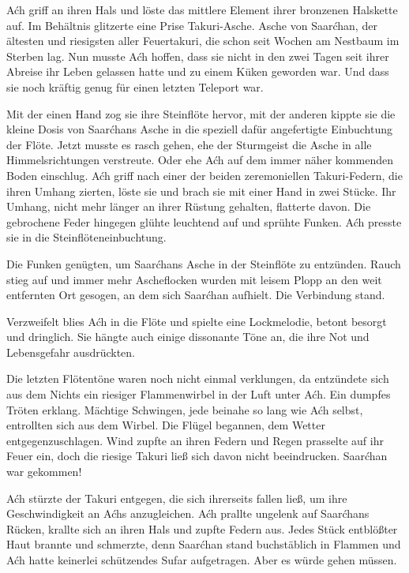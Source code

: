 Aćh griff an ihren Hals und löste das mittlere Element ihrer bronzenen Halskette auf. Im Behältnis glitzerte eine Prise Takuri-Asche. Asche von Saarćhan, der ältesten und riesigsten aller Feuertakuri, die schon seit Wochen am Nestbaum im Sterben lag. Nun musste Aćh hoffen, dass sie nicht in den zwei Tagen seit ihrer Abreise ihr Leben gelassen hatte und zu einem Küken geworden war. Und dass sie noch kräftig genug für einen letzten Teleport war.

Mit der einen Hand zog sie ihre Steinflöte hervor, mit der anderen kippte sie die kleine Dosis von Saarćhans Asche in die speziell dafür angefertigte Einbuchtung der Flöte. Jetzt musste es rasch gehen, ehe der Sturmgeist die Asche in alle Himmelsrichtungen verstreute. Oder ehe Aćh auf dem immer näher kommenden Boden einschlug. Aćh griff nach einer der beiden zeremoniellen Takuri-Federn, die ihren Umhang zierten, löste sie und brach sie mit einer Hand in zwei Stücke. Ihr Umhang, nicht mehr länger an ihrer Rüstung gehalten, flatterte davon. Die gebrochene Feder hingegen glühte leuchtend auf und sprühte Funken. Aćh presste sie in die Steinflöteneinbuchtung.

Die Funken genügten, um Saarćhans Asche in der Steinflöte zu entzünden. Rauch stieg auf und immer mehr Ascheflocken wurden mit leisem Plopp an den weit entfernten Ort gesogen, an dem sich Saarćhan aufhielt. Die Verbindung stand.

Verzweifelt blies Aćh in die Flöte und spielte eine Lockmelodie, betont besorgt und dringlich. Sie hängte auch einige dissonante Töne an, die ihre Not und Lebensgefahr ausdrückten.

Die letzten Flötentöne waren noch nicht einmal verklungen, da entzündete sich aus dem Nichts ein riesiger Flammenwirbel in der Luft unter Aćh. Ein dumpfes Tröten erklang. Mächtige Schwingen, jede beinahe so lang wie Aćh selbst, entrollten sich aus dem Wirbel. Die Flügel begannen, dem Wetter entgegenzuschlagen. Wind zupfte an ihren Federn und Regen prasselte auf ihr Feuer ein, doch die riesige Takuri ließ sich davon nicht beeindrucken. Saarćhan war gekommen!

Aćh stürzte der Takuri entgegen, die sich ihrerseits fallen ließ, um ihre Geschwindigkeit an Aćhs anzugleichen. Aćh prallte ungelenk auf Saarćhans Rücken, krallte sich an ihren Hals und zupfte Federn aus. Jedes Stück entblößter Haut brannte und schmerzte, denn Saarćhan stand buchstäblich in Flammen und Aćh hatte keinerlei schützendes Sufar aufgetragen. Aber es würde gehen müssen.

